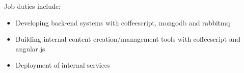 \normalsize
Job duties include:
\small
\begin{itemize}
    \item Developing back-end systems with coffeescript, mongodb and rabbitmq
    \item Building internal content creation/management tools with coffeescript and angular.js
    \item Deployment of internal services
\end{itemize}
\normalsize
\medskip
